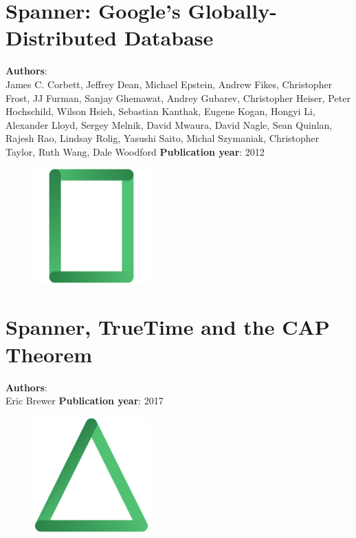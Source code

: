 \documentclass[11pt,fleqn]{book} %
\begin{document}
\chapter{Spanner: Google’s Globally-Distributed Database}
\vspace*{-7mm}
\Large \textbf{Authors}: \\
James C. Corbett, Jeffrey Dean, Michael Epstein, Andrew Fikes, Christopher Frost, JJ Furman, Sanjay Ghemawat, Andrey Gubarev, Christopher Heiser, Peter Hochschild, Wilson Hsieh, Sebastian Kanthak, Eugene Kogan, Hongyi Li, Alexander Lloyd, Sergey Melnik, David Mwaura, David Nagle, Sean Quinlan, Rajesh Rao, Lindsay Rolig, Yasushi Saito, Michal Szymaniak, Christopher Taylor, Ruth Wang, Dale Woodford
\newline\newline
\textbf{Publication year}: 2012
\begin{figure}[b]
    \centering
    \includegraphics[width=0.4\textwidth]{distributed-systems-rectangle.pdf}
\end{figure}


\chapter{Spanner, TrueTime and the CAP Theorem}
\vspace*{-7mm}
\Large \textbf{Authors}: \\
Eric Brewer
\newline\newline
\textbf{Publication year}: 2017
\begin{figure}[b]
    \centering
    \includegraphics[width=0.4\textwidth]{distributed-systems-triangle.pdf}
\end{figure}

\end{document}

